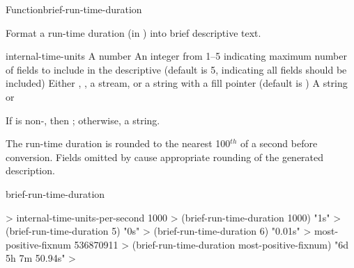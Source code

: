 \documentclass[10pt,twoside,english,pdftex]{article}
\begin{document}

\begin{functiondoc}{Function}{brief-run-time-duration}{%
    }
% 
% 

\fnsyntax

\fnpurpose Format a run-time duration (in )
into brief descriptive text.

\fnpackage {}

\fnmodule {}

\fnargs
\begin{args}{internal-time-units}
 A number
 An integer from 1--5 indicating maximum number of fields 
to include in the descriptive  (default is 5, indicating all 
fields should be included)
\arg[destination] Either \nil, , a stream, or a string with a fill 
pointer (default is \nil)
\arg[result] A string or \nil{}
\end{args}

\fnreturns If  is non-\nil, then \nil; otherwise, a string.

\fndescription The  run-time duration is rounded to
the nearest 100$^{th}$ of a second before conversion. Fields omitted by
 cause appropriate rounding of the generated
description.

\begin{alsos}{brief-run-time-duration}
\end{alsos}

\fnexamples
%
\W\supp
\begin{example}
  > internal-time-units-per-second
  1000
  > (brief-run-time-duration 1000)
  "1s"
  > (brief-run-time-duration 5)
  "0s"
  > (brief-run-time-duration 6)
  "0.01s"
  > most-positive-fixnum
  536870911
  > (brief-run-time-duration most-positive-fixnum)
  "6d 5h 7m 50.94s"
  >
\end{example}

\end{functiondoc}

\end{document}
